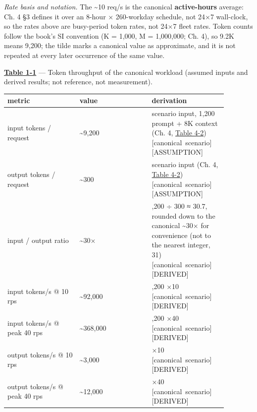 \emph{Rate basis and notation.} The \textasciitilde10 req/s is the
canonical \textbf{active-hours} average: Ch. 4 §3 defines it over an
8-hour × 260-workday schedule, not 24×7 wall-clock, so the rates above
are busy-period token rates, not 24×7 fleet rates. Token counts follow
the book's SI convention (K = 1,000, M = 1,000,000; Ch. 4), so 9.2K
means 9,200; the tilde marks a canonical value as approximate, and it is
not repeated at every later occurrence of the same value.

\textbf{\hyperref[tab:1.1]{Table 1-1}} --- Token throughput of the canonical workload
(assumed inputs and derived results; not reference, not measurement).

\nopagebreak[4]
\begin{longtable}[]{@{}
  >{\raggedright\arraybackslash}p{0.2927\linewidth}
  >{\raggedright\arraybackslash}p{0.2927\linewidth}
  >{\raggedright\arraybackslash}p{0.2927\linewidth}@{}}
\toprule\noalign{}
\begin{minipage}[b]{\linewidth}\raggedright
metric
\end{minipage} & \begin{minipage}[b]{\linewidth}\raggedright
value
\end{minipage} & \begin{minipage}[b]{\linewidth}\raggedright
derivation
\end{minipage} \\
\midrule\noalign{}
\endhead
\bottomrule\noalign{}
\endlastfoot
input tokens / request & \textasciitilde9,200 & scenario input, 1,200
prompt + 8K context (Ch. 4, \hyperref[tab:4.2]{Table 4-2}) \mbox{{[}canonical
scenario{]}}\hspace{0pt}\mbox{{[}ASSUMPTION{]}} \\
\noalign{\label{tab:1.1}}
output tokens / request & \textasciitilde300 & scenario input (Ch. 4,
\hyperref[tab:4.2]{Table 4-2}) \mbox{{[}canonical scenario{]}}\hspace{0pt}\mbox{{[}ASSUMPTION{]}} \\
input / output ratio & \textasciitilde30× & 9,200 ÷ 300 ≈ 30.7, rounded
down to the canonical \textasciitilde30× for convenience (not to the
nearest integer, 31) \mbox{{[}canonical scenario{]}}\hspace{0pt}\mbox{{[}DERIVED{]}} \\
input tokens/s @ 10 rps & \textasciitilde92,000 & 9,200 ×10 \mbox{{[}canonical
scenario{]}}\hspace{0pt}\mbox{{[}DERIVED{]}} \\
input tokens/s @ peak 40 rps & \textasciitilde368,000 & 9,200 ×40
\mbox{{[}canonical scenario{]}}\hspace{0pt}\mbox{{[}DERIVED{]}} \\
output tokens/s @ 10 rps & \textasciitilde3,000 & 300 ×10 \mbox{{[}canonical
scenario{]}}\hspace{0pt}\mbox{{[}DERIVED{]}} \\
output tokens/s @ peak 40 rps & \textasciitilde12,000 & 300 ×40
\mbox{{[}canonical scenario{]}}\hspace{0pt}\mbox{{[}DERIVED{]}} \\
\end{longtable}

